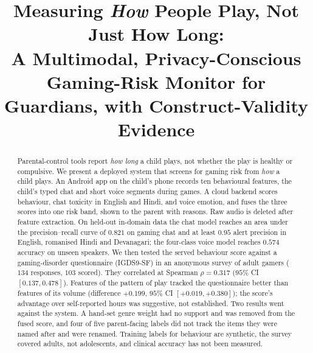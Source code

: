 \documentclass[conference]{IEEEtran}
\begin{document}
\title{Measuring \emph{How} People Play, Not Just How Long:\\
A Multimodal, Privacy-Conscious Gaming-Risk Monitor for Guardians, with Construct-Validity Evidence}

\newif\ifanon \anonfalse
\ifanon
\author{\IEEEauthorblockN{Anonymous submission}\IEEEauthorblockA{Code and data artefacts will be released on acceptance.}}
\else
\author{
}
\fi

\maketitle

\begin{abstract}
Parental-control tools report \emph{how long} a child plays, not whether the play is
healthy or compulsive. We present a deployed system that screens for gaming risk from
\emph{how} a child plays. An Android app on the child's phone records ten behavioural
features, the child's typed chat and short voice segments during games. A cloud backend
scores behaviour, chat toxicity in English and Hindi, and voice emotion, and fuses the
three scores into one risk band, shown to the parent with reasons. Raw audio is deleted
after feature extraction. On held-out in-domain data the chat model reaches an area
under the precision--recall curve of $0.821$ on gaming chat and at least $0.95$ alert
precision in English, romanised Hindi and Devanagari; the four-class voice model
reaches $0.574$ accuracy on unseen speakers. We then tested the served behaviour score
against a gaming-disorder questionnaire (IGDS9-SF) in an anonymous survey of adult
gamers ($134$ responses, $103$ scored). They correlated at Spearman $\rho{=}0.317$
($95\%$ CI $[0.137,0.478]$). Features of the pattern of play tracked the questionnaire
better than features of its volume (difference $+0.199$, $95\%$ CI $[+0.019,+0.380]$);
the score's advantage over self-reported hours was suggestive, not established. Two
results went against the system. A hand-set genre weight had no support and was removed
from the fused score, and four of five parent-facing labels did not track the items
they were named after and were renamed. Training labels for behaviour are synthetic,
the survey covered adults, not adolescents, and clinical accuracy has not been measured.
\end{abstract}
\end{document}
